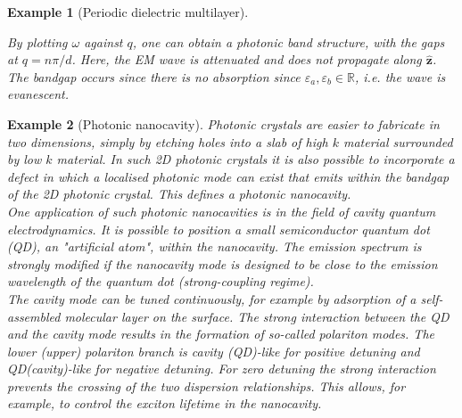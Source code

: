 \documentclass[a4paper]{article}
\newtheorem{eg}{Example}[section]
\theoremstyle{new}
\begin{document}
\begin{eg}[Periodic dielectric multilayer]
\begin{center}
\end{center}
By plotting $\omega$ against $q$, one can obtain a photonic band structure, with the gaps at $q=n\pi/d$. Here, the EM wave is attenuated and does not propagate along $\mathbf{\hat{z}}$. The bandgap occurs since there is no absorption since $\varepsilon_a,\varepsilon_b\in\mathbb{R}$, i.e. the wave is evanescent. 
\end{eg}
\begin{eg}[Photonic nanocavity]
Photonic crystals are easier to fabricate in two dimensions, simply by etching holes into a slab of high $k$ material surrounded by low $k$ material. In such 2D photonic crystals it is also possible to incorporate a defect in which a localised photonic mode can exist that emits within the bandgap of the 2D photonic crystal. This defines a photonic nanocavity.\\[5pt]
One application of such photonic nanocavities is in the field of cavity quantum electrodynamics. It is possible to position a small semiconductor quantum dot (QD), an "artificial atom", within the nanocavity. The emission spectrum is strongly modified if the nanocavity mode is designed to be close to the emission wavelength of the quantum dot (strong-coupling regime).\\[5pt]
The cavity mode can be tuned continuously, for example by adsorption of a self-assembled molecular layer on the surface. The strong interaction between the QD and the cavity mode results in the formation of so-called polariton modes. The lower (upper) polariton branch is cavity (QD)-like for positive detuning and QD(cavity)-like for negative detuning. For zero detuning the strong interaction prevents the crossing of the two dispersion relationships. This allows, for example, to control the exciton lifetime in the nanocavity. 
\end{eg}
\newpage
\end{document}
